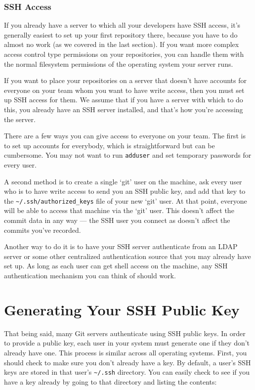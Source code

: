 \documentclass[a4paper]{book}
\begin{document}
\subsubsection{SSH Access}

If you already have a server to which all your developers have SSH access, it's generally easiest to set up your first repository there, because you have to do almost no work (as we covered in the last section). If you want more complex access control type permissions on your repositories, you can handle them with the normal filesystem permissions of the operating system your server runs.

If you want to place your repositories on a server that doesn't have accounts for everyone on your team whom you want to have write access, then you must set up SSH access for them. We assume that if you have a server with which to do this, you already have an SSH server installed, and that's how you're accessing the server.

There are a few ways you can give access to everyone on your team. The first is to set up accounts for everybody, which is straightforward but can be cumbersome. You may not want to run \texttt{adduser} and set temporary passwords for every user.

A second method is to create a single `git' user on the machine, ask every user who is to have write access to send you an SSH public key, and add that key to the \texttt{\textasciitilde{}/.ssh/authorized\_keys} file of your new `git' user. At that point, everyone will be able to access that machine via the `git' user. This doesn't affect the commit data in any way --- the SSH user you connect as doesn't affect the commits you've recorded.

Another way to do it is to have your SSH server authenticate from an LDAP server or some other centralized authentication source that you may already have set up. As long as each user can get shell access on the machine, any SSH authentication mechanism you can think of should work.

\section{Generating Your SSH Public Key}

That being said, many Git servers authenticate using SSH public keys. In order to provide a public key, each user in your system must generate one if they don't already have one. This process is similar across all operating systems. First, you should check to make sure you don't already have a key. By default, a user's SSH keys are stored in that user's \texttt{\textasciitilde{}/.ssh} directory. You can easily check to see if you have a key already by going to that directory and listing the contents:
\end{document}
